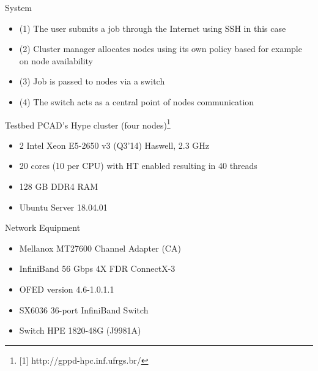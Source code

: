 \documentclass{beamer}
\begin{document}
\begin{frame}{System}
\begin{center}
\end{center}    
    \begin{itemize}
    \item (1) The user submits a job through the Internet using SSH in this case
    \item (2) Cluster manager allocates nodes using its own policy based for example on node availability
    \item (3) Job is passed to nodes via a switch
    \item (4) The switch acts as a central point of nodes communication
    \end{itemize}
\end{frame}

\begin{frame}{Testbed}
PCAD's Hype cluster (four nodes)\footnote{[1] http://gppd-hpc.inf.ufrgs.br/}
\begin{itemize}
\item 2 \texttimes{} Intel Xeon E5-2650 v3 (Q3'14) Haswell, 2.3 GHz
\item 20 cores (10 per CPU) with HT enabled resulting in 40 threads
\item 128 GB DDR4 RAM
\item Ubuntu Server 18.04.01
\end{itemize}
Network Equipment
\begin{itemize}
\item Mellanox MT27600 Channel Adapter (CA)
\item InfiniBand 56 Gbps 4X FDR ConnectX-3
\item OFED version 4.6-1.0.1.1
\item SX6036 36-port InfiniBand Switch
\item Switch HPE 1820-48G (J9981A)
\end{itemize}
\end{frame}
\end{document}
